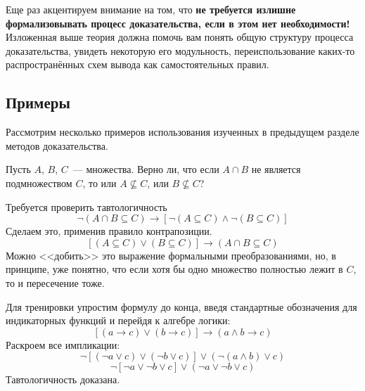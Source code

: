 Еще раз акцентируем внимание на том, что \textbf{не требуется излишне формализовывать процесс доказательства, если в этом нет необходимости!}
Изложенная выше теория должна помочь вам понять общую структуру процесса доказательства, увидеть некоторую его модульность,
переиспользование каких-то распространённых схем вывода как самостоятельных правил.





\subsection{Примеры}
\label{subsec:formal_systems:examples}

Рассмотрим несколько примеров использования изученных в предыдущем разделе методов доказательства.

\begin{Exercise}[counter=SecExercise]
    \noindent
    Пусть $ A $, $ B $, $ C $~--- множества.
    Верно ли, что если $ A \cap B $ не является подмножеством $ C $, то или $ A \not\subseteq C $, или $ B \not\subseteq C $?
\end{Exercise}

\begin{Answer}
    \noindent
    Требуется проверить тавтологичность
    \[
        \neg (A \cap B \subseteq C) \rightarrow \left[ \neg (A \subseteq C) \wedge \neg (B \subseteq C) \right]
    \]
    Сделаем это, применив правило контрапозиции.
    \[
        \left[ (A \subseteq C) \vee (B \subseteq C) \right] \rightarrow (A \cap B \subseteq C)
    \]
    Можно <<добить>> это выражение формальными преобразованиями, но, в принципе, уже понятно, что если хотя бы одно множество полностью лежит в $ C $, то и пересечение тоже.

    Для тренировки упростим формулу до конца, введя стандартные обозначения для индикаторных функций и перейдя к алгебре логики:
    \[
        \left[ (a \rightarrow c) \vee (b \rightarrow c) \right] \rightarrow (a \wedge b \rightarrow c)
    \]
    Раскроем все импликации:
    \[
        \neg \left[ (\neg a \vee c) \vee (\neg b \vee c) \right] \vee (\neg(a \wedge b) \vee c)
    \]
    \[
        \neg [\neg a \vee \neg b \vee c] \vee (\neg a \vee \neg b \vee c)
    \]
    Тавтологичность доказана.
\end{Answer}


